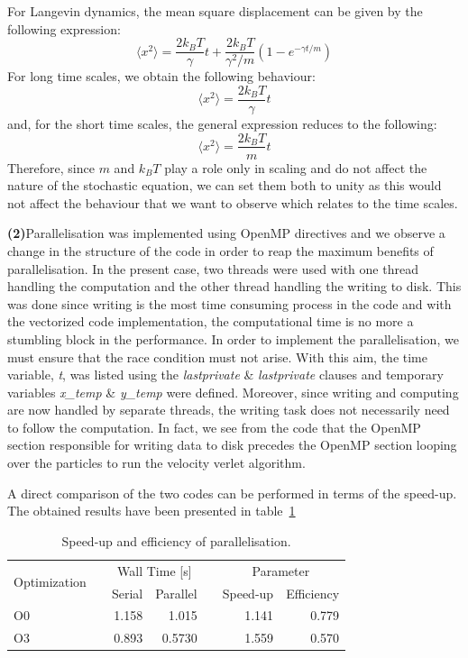 \documentclass[11pt, oneside]{article}
\begin{document}
For Langevin dynamics, the mean square displacement can be given by the following expression:
\begin{equation}
  \langle{x^2}\rangle = \frac{2 k_B T}{\gamma} t + \frac{2 k_B T}{\gamma^2/m}(1 - e^{-\gamma t/m})
\end{equation}
For long time scales, we obtain the following behaviour: \[\langle{x^2}\rangle = \frac{2 k_B T}{\gamma} t\] and, for the short time scales, the general expression reduces to the following:  \[\langle{x^2}\rangle = \frac{2 k_B T}{m}t\] Therefore, since \(m\) and \(k_B T\) play a role only in scaling and do not affect the nature of the stochastic equation, we can set them both to unity as this would not affect the behaviour that we want to observe which relates to the time scales.
 
\textbf{(2)}\quad Parallelisation was implemented using OpenMP directives and we observe a change in the structure of the code in order to reap the maximum benefits of parallelisation. In the present case, two threads were used with one thread handling the computation and the other thread handling the writing to disk. This was done since writing is the most time consuming process in the code and with the vectorized code implementation, the computational time is no more a stumbling block in the performance. In order to implement the  parallelisation, we must ensure that the race condition must not arise. With this aim, the time variable, \textit{t}, was listed using the \textit{lastprivate} \& \textit{lastprivate} clauses and temporary variables \textit{x\_temp} \& \textit{y\_temp} were defined. Moreover, since writing and computing are now handled by separate threads, the writing task does not necessarily need to follow the computation. In fact, we see from the code that the OpenMP section responsible for writing data to disk precedes the OpenMP section looping over the particles to run the velocity verlet algorithm.

A direct comparison of the two codes can be performed in terms of the speed-up. The obtained results have been presented in  table~\ref{tab:su}
\begin{table}[h]
  \caption{Speed-up and efficiency of parallelisation.}
  \label{tab:su}
  \centering
  \begin{tabular}{lcrrcrr}
    \toprule
    \multirow{2}{*}{Optimization} &\phantom{abc} & \multicolumn{2}{c}{Wall Time [s]} &\phantom{abc} & \multicolumn{2}{c}{Parameter} \\
    \cmidrule{3-4} \cmidrule{6-7}
    &\phantom{abc} & {Serial} & {Parallel} & \phantom{abc} & {Speed-up} & {Efficiency}\\
    \midrule
    O0 && 1.158 & 1.015 && 1.141 & 0.779\\
    O3 && 0.893 & 0.5730 && 1.559 & 0.570\\
    \bottomrule
  \end{tabular}
\end{table}
\end{document}
